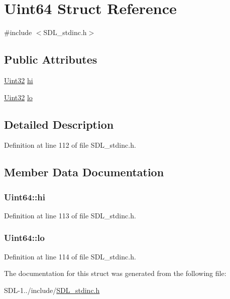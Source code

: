 \hypertarget{struct_uint64}{}\section{Uint64 Struct Reference}
\label{struct_uint64}


{\ttfamily \#include $<$S\+D\+L\+\_\+stdinc.\+h$>$}

\subsection*{Public Attributes}
\begin{DoxyCompactItemize}
\item 
\hyperlink{_s_d_l__stdinc_8h_add440eff171ea5f55cb00c4a9ab8672d}{Uint32} \hyperlink{struct_uint64_aebe59cbeb37832b60d27071eca9fef3f}{hi}
\item 
\hyperlink{_s_d_l__stdinc_8h_add440eff171ea5f55cb00c4a9ab8672d}{Uint32} \hyperlink{struct_uint64_a110735976529c94010e0e1ff33bcb116}{lo}
\end{DoxyCompactItemize}


\subsection{Detailed Description}


Definition at line 112 of file S\+D\+L\+\_\+stdinc.\+h.



\subsection{Member Data Documentation}
\hypertarget{struct_uint64_aebe59cbeb37832b60d27071eca9fef3f}{}
\subsubsection[{hi}]{ Uint64\+::hi}\label{struct_uint64_aebe59cbeb37832b60d27071eca9fef3f}


Definition at line 113 of file S\+D\+L\+\_\+stdinc.\+h.

\hypertarget{struct_uint64_a110735976529c94010e0e1ff33bcb116}{}
\subsubsection[{lo}]{ Uint64\+::lo}\label{struct_uint64_a110735976529c94010e0e1ff33bcb116}


Definition at line 114 of file S\+D\+L\+\_\+stdinc.\+h.



The documentation for this struct was generated from the following file\+:\begin{DoxyCompactItemize}
\item 
S\+D\+L-\/1../include/\hyperlink{_s_d_l__stdinc_8h}{S\+D\+L\+\_\+stdinc.\+h}\end{DoxyCompactItemize}
